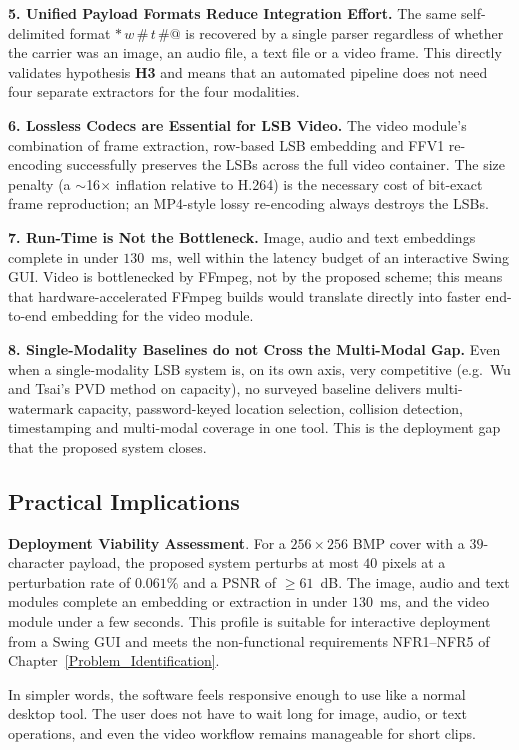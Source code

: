 \textbf{5. Unified Payload Formats Reduce Integration Effort.} The same self-delimited format $\texttt{*}\,w\,\texttt{\#}\,t\,\texttt{\#@}$ is recovered by a single parser regardless of whether the carrier was an image, an audio file, a text file or a video frame. This directly validates hypothesis \textbf{H3} and means that an automated pipeline does not need four separate extractors for the four modalities.

\textbf{6. Lossless Codecs are Essential for LSB Video.} The video module's combination of frame extraction, row-based LSB embedding and FFV1 re-encoding successfully preserves the LSBs across the full video container. The size penalty (a $\sim$16$\times$ inflation relative to H.264) is the necessary cost of bit-exact frame reproduction; an MP4-style lossy re-encoding always destroys the LSBs.

\textbf{7. Run-Time is Not the Bottleneck.} Image, audio and text embeddings complete in under $130$~ms, well within the latency budget of an interactive Swing GUI. Video is bottlenecked by FFmpeg, not by the proposed scheme; this means that hardware-accelerated FFmpeg builds would translate directly into faster end-to-end embedding for the video module.

\textbf{8. Single-Modality Baselines do not Cross the Multi-Modal Gap.} Even when a single-modality LSB system is, on its own axis, very competitive (e.g.\ Wu and Tsai's PVD method on capacity), no surveyed baseline delivers multi-watermark capacity, password-keyed location selection, collision detection, timestamping and multi-modal coverage in one tool. This is the deployment gap that the proposed system closes.

\subsection{Practical Implications}

\textbf{Deployment Viability Assessment}. For a $256 \times 256$ BMP cover with a $39$-character payload, the proposed system perturbs at most $40$ pixels at a perturbation rate of $0.061\%$ and a PSNR of $\ge 61$~dB. The image, audio and text modules complete an embedding or extraction in under $130$~ms, and the video module under a few seconds. This profile is suitable for interactive deployment from a Swing GUI and meets the non-functional requirements NFR1--NFR5 of Chapter~\ref{Problem_Identification}.

In simpler words, the software feels responsive enough to use like a normal desktop tool. The user does not have to wait long for image, audio, or text operations, and even the video workflow remains manageable for short clips.

